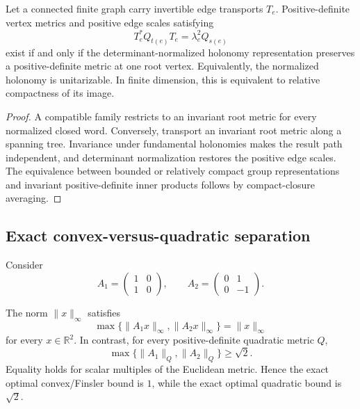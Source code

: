 \begin{theorem}
\label{thm:block19-metric-completion}
Let a connected finite graph carry invertible edge transports \(T_e\).  Positive-definite vertex metrics and positive edge scales satisfying
\[
 T_e^*Q_{t(e)}T_e=\lambda_e^2Q_{s(e)}
\]
exist if and only if the determinant-normalized holonomy representation preserves a positive-definite metric at one root vertex.  Equivalently, the normalized holonomy is unitarizable.  In finite dimension, this is equivalent to relative compactness of its image.
\end{theorem}

\begin{proof}
A compatible family restricts to an invariant root metric for every normalized closed word.  Conversely, transport an invariant root metric along a spanning tree.  Invariance under fundamental holonomies makes the result path independent, and determinant normalization restores the positive edge scales.  The equivalence between bounded or relatively compact group representations and invariant positive-definite inner products follows by compact-closure averaging.
\end{proof}

\subsection{Exact convex-versus-quadratic separation}
\label{subsec:block19-convex-quadratic}

Consider
\[
 A_1=\begin{pmatrix}1&0\\1&0\end{pmatrix},
 \qquad
 A_2=\begin{pmatrix}0&1\\0&-1\end{pmatrix}.
\]

\begin{theorem}
\label{thm:block19-convex-quadratic-separation}
The norm \(\|x\|_\infty\) satisfies
\[
 \max\{\|A_1x\|_\infty,\|A_2x\|_\infty\}
 =\|x\|_\infty
\]
for every \(x\in\mathbb R^2\).  In contrast, for every positive-definite quadratic metric \(Q\),
\[
 \max\{\|A_1\|_Q,\|A_2\|_Q\}\geq\sqrt2.
\]
Equality holds for scalar multiples of the Euclidean metric.  Hence the exact optimal convex/Finsler bound is \(1\), while the exact optimal quadratic bound is \(\sqrt2\).
\end{theorem}

